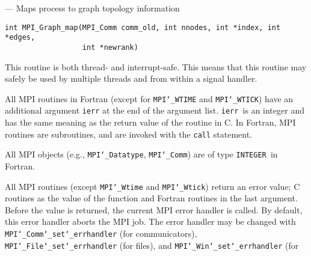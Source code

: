 \startmanpage
{}
--- Maps process to graph topology information 
\startvb\begin{verbatim}
int MPI_Graph_map(MPI_Comm comm_old, int nnodes, int *index, int *edges,
                  int *newrank)

\end{verbatim}
\endvb

\par
{}
\par
{}
\par
This routine is both thread- and interrupt-safe.
This means that this routine may safely be used by multiple threads and
from within a signal handler.
\par
{}
All MPI routines in Fortran (except for {\tt MPI{\tt \char`\_}WTIME} and {\tt MPI{\tt \char`\_}WTICK}) have
an additional argument {\tt ierr} at the end of the argument list.  {\tt ierr
}is an integer and has the same meaning as the return value of the routine
in C.  In Fortran, MPI routines are subroutines, and are invoked with the
{\tt call} statement.
\par
All MPI objects (e.g., {\tt MPI{\tt \char`\_}Datatype}, {\tt MPI{\tt \char`\_}Comm}) are of type {\tt INTEGER
}in Fortran.
\par
{}
\par
All MPI routines (except {\tt MPI{\tt \char`\_}Wtime} and {\tt MPI{\tt \char`\_}Wtick}) return an error value;
C routines as the value of the function and Fortran routines in the last
argument.  Before the value is returned, the current MPI error handler is
called.  By default, this error handler aborts the MPI job.  The error handler
may be changed with {\tt MPI{\tt \char`\_}Comm{\tt \char`\_}set{\tt \char`\_}errhandler} (for communicators),
{\tt MPI{\tt \char`\_}File{\tt \char`\_}set{\tt \char`\_}errhandler} (for files), and {\tt MPI{\tt \char`\_}Win{\tt \char`\_}set{\tt \char`\_}errhandler} (for
